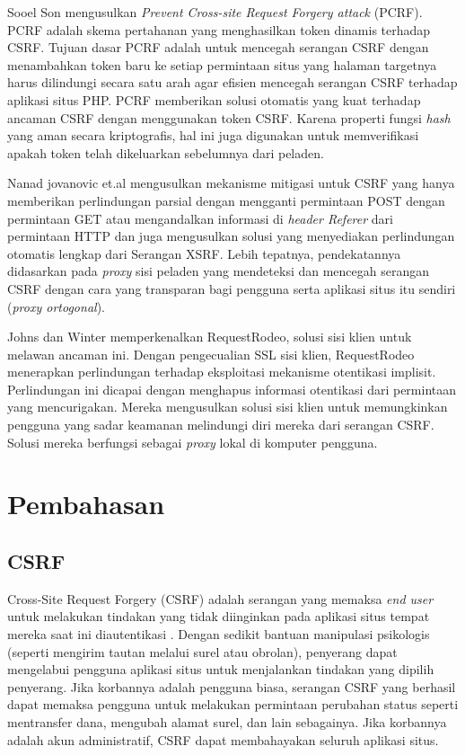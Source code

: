 \documentclass{article}
\begin{document}
Sooel Son \cite{son2010prevent} mengusulkan \textit{Prevent Cross-site Request Forgery attack} (PCRF). PCRF adalah skema pertahanan yang menghasilkan token dinamis terhadap CSRF. Tujuan dasar PCRF adalah untuk mencegah serangan CSRF dengan menambahkan token baru ke setiap permintaan situs yang halaman targetnya harus dilindungi secara satu arah agar efisien mencegah serangan CSRF terhadap aplikasi situs PHP. PCRF memberikan solusi otomatis yang kuat terhadap ancaman CSRF dengan menggunakan token CSRF. Karena properti fungsi \textit{hash} yang aman secara kriptografis, hal ini juga digunakan untuk memverifikasi apakah token telah dikeluarkan sebelumnya dari peladen.

Nanad jovanovic et.al \cite{jovanovic2006preventing} mengusulkan mekanisme mitigasi untuk CSRF yang hanya memberikan perlindungan parsial dengan mengganti permintaan POST dengan permintaan GET atau mengandalkan informasi di \textit{header Referer} dari permintaan HTTP dan juga mengusulkan solusi yang menyediakan perlindungan otomatis lengkap dari Serangan XSRF. Lebih tepatnya, pendekatannya didasarkan pada \textit{proxy} sisi peladen yang mendeteksi dan mencegah serangan CSRF dengan cara yang transparan bagi pengguna serta aplikasi situs itu sendiri (\textit{proxy ortogonal}).

Johns dan Winter \cite{johns2006requestrodeo} memperkenalkan RequestRodeo, solusi sisi klien untuk melawan ancaman ini. Dengan pengecualian SSL sisi klien, RequestRodeo menerapkan perlindungan terhadap eksploitasi mekanisme otentikasi implisit. Perlindungan ini dicapai dengan menghapus informasi otentikasi dari permintaan yang mencurigakan. Mereka mengusulkan solusi sisi klien untuk memungkinkan pengguna yang sadar keamanan melindungi diri mereka dari serangan CSRF. Solusi mereka berfungsi sebagai \textit{proxy} lokal di komputer pengguna.

\section{Pembahasan}
\subsection{CSRF}
Cross-Site Request Forgery (CSRF) adalah serangan yang memaksa \textit{end user} untuk melakukan tindakan yang tidak diinginkan pada aplikasi situs tempat mereka saat ini diautentikasi \cite{csrf_owasp}. Dengan sedikit bantuan manipulasi psikologis (seperti mengirim tautan melalui surel atau obrolan), penyerang dapat mengelabui pengguna aplikasi situs untuk menjalankan tindakan yang dipilih penyerang. Jika korbannya adalah pengguna biasa, serangan CSRF yang berhasil dapat memaksa pengguna untuk melakukan permintaan perubahan status seperti mentransfer dana, mengubah alamat surel, dan lain sebagainya. Jika korbannya adalah akun administratif, CSRF dapat membahayakan seluruh aplikasi situs.
\end{document}
